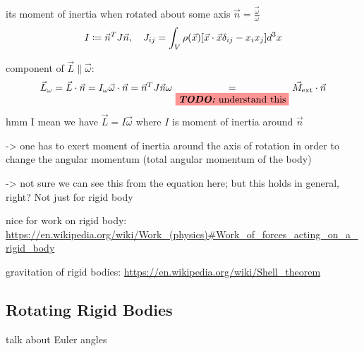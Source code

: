 \documentclass[../class_mech_main.tex]{subfiles}
\begin{document}
its moment of inertia when rotated about some axis $\vec{n} = \frac{\vec{\omega}}{\omega}$
\begin{equation}
	I \coloneqq \vec{n}^T J \vec{n}, \quad J_{ij} = \int_V \rho(\vec{x}) \qty[\vec{x} \cdot \vec{x} \delta_{ij} - x_i x_j] d^3x
\end{equation}


component of $\vec{L} \parallel \vec{\omega}$:
\begin{equation}
	\vec{L}_\omega = \vec{L} \cdot \vec{n} = I_\omega \vec{\omega} \cdot \vec{n} = \vec{n}^T J \vec{n} \omega \underset{\todo{understand this}}{=} \vec{M}_\mathrm{ext} \cdot \vec{n}
\end{equation}
hmm I mean we have $\vec{L} = I \vec{\omega}$ where $I$ is moment of inertia around $\vec{n}$

-> one has to exert moment of inertia around the axis of rotation in order to change the angular momentum (total angular momentum of the body)

-> not sure we can see this from the equation here; but this holds in general, right? Not just for rigid body




nice for work on rigid body: \url{https://en.wikipedia.org/wiki/Work_(physics)#Work_of_forces_acting_on_a_rigid_body}



gravitation of rigid bodies: \url{https://en.wikipedia.org/wiki/Shell_theorem}



		\subsection{Rotating Rigid Bodies}
talk about Euler angles
\end{document}
